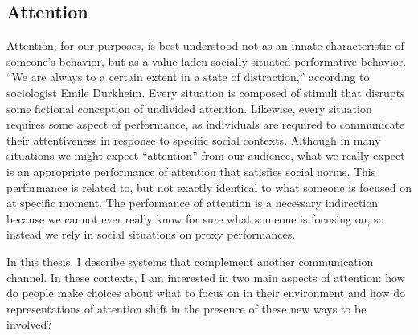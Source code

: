 




\subsection{Attention}

Attention, for our purposes, is best understood not as an innate characteristic of someone's behavior, but as a value-laden socially situated performative behavior. ``We are always to a certain extent in a state of distraction,'' according to sociologist Emile Durkheim. \citep{Durkheim:1974tc} Every situation is composed of stimuli that disrupts some fictional conception of undivided attention.  Likewise, every situation requires some aspect of performance, as individuals are required to communicate their attentiveness in response to specific social contexts.  Although in many situations we might expect ``attention'' from our audience, what we really expect is an appropriate performance of attention that satisfies social norms. This performance is related to, but not exactly identical to what someone is focused on at specific moment. The performance of attention is a necessary indirection because we cannot ever really know for sure what someone is focusing on, so instead we rely in social situations on proxy performances.

In this thesis, I describe systems that complement another communication channel. In these contexts, I am interested in two main aspects of attention: how do people make choices about what to focus on in their environment and how do representations of attention shift in the presence of these new ways to be involved?

